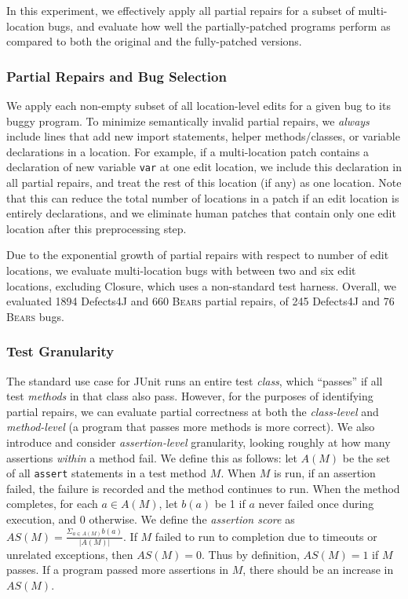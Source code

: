\documentclass[10pt,journal,compsoc]{IEEEtran}
\newcommand\bears{\textsc{Bears}\xspace}
\begin{document}
In this experiment, we effectively apply all partial repairs for
a subset of multi-location bugs, and
evaluate how well the partially-patched programs perform 
as compared to both the original and the fully-patched versions. 

\subsubsection{Partial Repairs and Bug Selection}
We apply each non-empty subset of all location-level edits for a given bug to
its buggy program.  To minimize semantically invalid partial repairs, we \emph{always}
include lines that add new import statements, helper methods/classes, or variable declarations
in a location. 
For example, if a multi-location patch contains a declaration of new variable
\texttt{var} at one edit location,
we include this declaration in all partial repairs, and treat the rest of this location (if any) as one location.
Note that this can reduce the total
number of locations in a patch if an edit location is entirely declarations, and we eliminate
human patches that contain only 
one edit location after this preprocessing step. 

Due to the exponential growth of partial repairs with respect to number of edit locations,
we evaluate multi-location bugs with
between two and six edit locations, excluding Closure, which uses a
non-standard test harness. 
Overall, we evaluated 1894 Defects4J and 660 \bears partial repairs,
of 245 Defects4J and 76 \bears bugs.

\subsubsection{Test Granularity}

The standard use case for JUnit runs
an entire test \emph{class}, which ``passes'' if all test \emph{methods} in
that class also pass.  However, for the purposes of identifying partial repairs,
we can evaluate partial correctness at both the \emph{class-level} and
\emph{method-level} (a program that passes more methods is more
correct).
We also introduce and consider \emph{assertion-level} granularity, looking
roughly at how many assertions \emph{within} a method fail.  We define this as follows:
let $A(M)$ be the set of all \texttt{assert}
statements in a test method $M$. 
When $M$ is run, if an assertion failed, the failure is recorded and the method 
continues to run.  When the method completes, for each
$a\in A(M)$, let $b(a)$ be 1 if $a$ never failed once during execution,
and 0 otherwise. We define the \emph{assertion score} as
$AS(M)=\frac{\Sigma_{a\in A(M)}b(a)}{|A(M)|}$. If $M$ failed to run to completion 
due to timeouts or unrelated exceptions, then
$AS(M)=0$. Thus by definition, $AS(M)=1$ if $M$ passes. If a program passed more 
assertions in $M$, there should be an increase in $AS(M)$.
\end{document}
